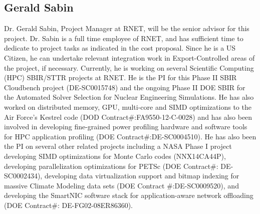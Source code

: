 \subsection{Gerald Sabin}
Dr. Gerald Sabin, Project Manager at RNET, will be the senior advisor for this project.
Dr.  Sabin is a full time employee of RNET, and has sufficient time to dedicate to project tasks as indicated in the
cost proposal. Since he is a US Citizen, he can undertake relevant
integration work in Export-Controlled areas of the project, if
necessary. Currently, he is working on several Scientific Computing
(HPC) SBIR/STTR projects at RNET. He is the PI for this Phase II SBIR
Cloudbench project (DE-SC0015748) and the ongoing Phase II DOE SBIR for the Automated Solver Selection for Nuclear
Engineering Simulations. He has also worked on distributed memory,
GPU, multi-core and SIMD optimizations to the Air Force's Kestrel code
(DOD Contract\#:FA9550-12-C-0028) and has also been involved in
developing fine-grained power profiling hardware and software tools
for HPC application profiling (DOE Contract\#:DE-SC0004510). He has
also been the PI on several other related projects including a NASA
Phase I project developing SIMD optimizations for Monte Carlo codes
(NNX14CA44P), developing parallelization optimizations for PETSc (DOE
Contract\#: DE-SC0002434), developing data virtualization support and
bitmap indexing for massive Climate Modeling data sets (DOE Contract
\#:DE-SC0009520), and developing the SmartNIC software stack for
application-aware network offloading (DOE Contract\#:
DE-FG02-08ER86360).
